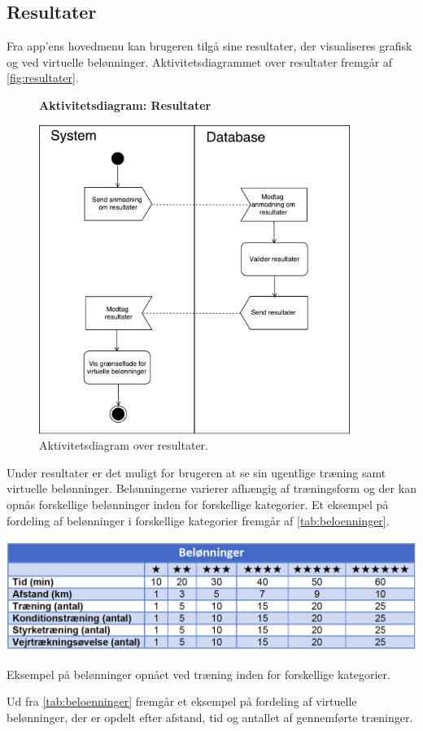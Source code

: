 \subsection*{Resultater}
Fra app'ens hovedmenu kan brugeren tilgå sine resultater, der visualiseres grafisk og ved virtuelle belønninger.
Aktivitetsdiagrammet over resultater fremgår af \autoref{fig:resultater}.

\begin{figure} [H]
\centering
\textbf{Aktivitetsdiagram: Resultater}\par\medskip
\includegraphics[width=0.9\textwidth]{figures/aktivitetsdiagram/Resultater}
\caption{Aktivitetsdiagram over resultater.}
\label{fig:resultater}
\end{figure}

\noindent
Under resultater er det muligt for brugeren at se sin ugentlige træning samt virtuelle belønninger. Belønningerne varierer afhængig af træningsform og der kan opnås forskellige belønninger inden for forskellige kategorier. Et eksempel på fordeling af belønninger i forskellige kategorier fremgår af \autoref{tab:beloenninger}.

\begin{table} [H]
\centering
\includegraphics[width=1\textwidth]{figures/aktivitetsdiagram/beloenninger}
\caption{Eksempel på belønninger opnået ved træning inden for forskellige kategorier.}
\label{tab:beloenninger}
\end{table}

\noindent
Ud fra \autoref{tab:beloenninger} fremgår et eksempel på fordeling af virtuelle belønninger, der er opdelt efter afstand, tid og antallet af gennemførte træninger. 